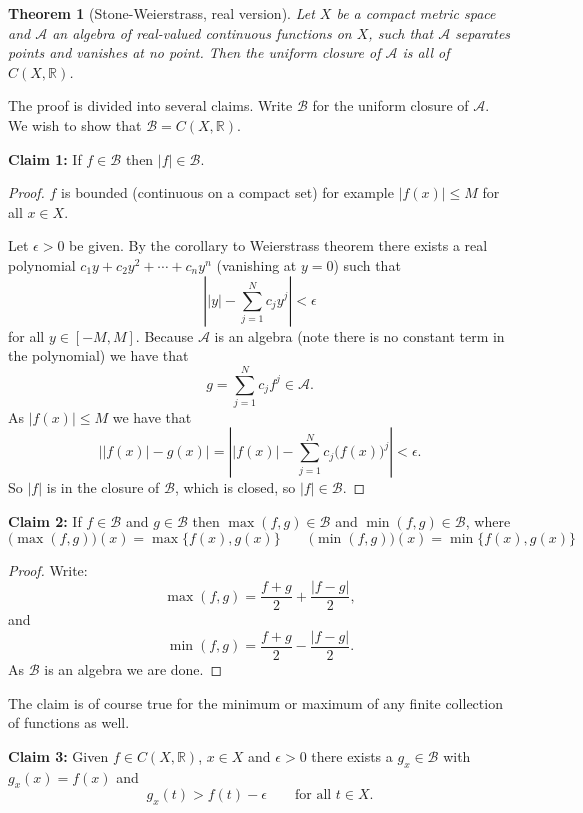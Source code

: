 \documentclass[12pt]{book}
\newcommand{\abs}[1]{\left\lvert {#1} \right\rvert}
\newcommand{\R}{{\mathbb{R}}}
\newcommand{\sA}{{\mathcal{A}}}
\newcommand{\sB}{{\mathcal{B}}}
\theoremstyle{plain}
\newtheorem{thm}{Theorem}[section]
\theoremstyle{remark}
\theoremstyle{definition}
\theoremstyle{exercise}
\theoremstyle{example}
\begin{document}
\medskip

\begin{thm}[Stone-Weierstrass, real version]
Let $X$ be a compact metric space and $\sA$ an algebra of real-valued
continuous functions on $X$, such that $\sA$ separates points and vanishes at
no point.  Then the uniform closure of $\sA$ is all of $C(X,\R)$.
\end{thm}

The proof is divided into several claims.  Write $\sB$ for the uniform
closure of $\sA$.  We wish to show that $\sB = C(X,\R)$.

\medskip

\textbf{Claim 1:} If $f \in \sB$ then $\abs{f} \in \sB$.

\begin{proof}
$f$ is bounded (continuous on a compact set) for example $\abs{f(x)} \leq M$
for all $x \in X$.

Let $\epsilon > 0$ be given.  By the corollary to Weierstrass theorem there
exists a real polynomial $c_1 y + c_2 y^2 + \cdots+ c_n y^n$ (vanishing at
$y=0$) such that
$$
\abs{\abs{y} - \sum_{j=1}^N c_j y^j} < \epsilon
$$
for all $y \in [-M,M]$.
Because $\sA$ is an algebra (note there is no constant term in the polynomial)
we have that
$$
g = \sum_{j=1}^N c_j f^j \in \sA .
$$
As $\abs{f(x)} \leq M$ we have that
$$
\bigl\lvert\abs{f(x)} - g(x)\bigr\rvert
=
\abs{\abs{f(x)} - \sum_{j=1}^N c_j {\bigl(f(x)\bigr)}^j}
< \epsilon .
$$
So $\abs{f}$ is in the closure of $\sB$, which is closed, so $\abs{f} \in
\sB$.
\end{proof}

\medskip

\textbf{Claim 2:} If $f \in \sB$ and $g \in \sB$ then
$\max(f,g) \in \sB$ and
$\min(f,g) \in \sB$, where
$$
\bigl(\max(f,g)\bigr) (x) = \max \{ f(x), g(x) \} \qquad
\bigl(\min(f,g)\bigr) (x) = \min \{ f(x), g(x) \}
$$

\begin{proof}
Write:
$$
\max(f,g) = \frac{f+g}{2} + \frac{\abs{f-g}}{2} ,
$$
and
$$
\min(f,g) = \frac{f+g}{2} - \frac{\abs{f-g}}{2} .
$$
As $\sB$ is an algebra we are done.
\end{proof}

The claim is of course true for the minimum or maximum of any finite
collection of functions as well.

\medskip

\textbf{Claim 3:} Given $f \in C(X,\R)$, $x \in X$ and $\epsilon > 0$
there exists a $g_x \in \sB$ with $g_x(x) = f(x)$ and
$$
g_x(t) > f(t)-\epsilon \qquad \text{for all $t \in X$}.
$$
\end{document}
